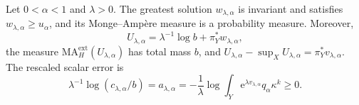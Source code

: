 \begin{proposition}\label{prop:nonlp-selection-separated}
Let $0<\alpha<1$ and $\lambda>0$. The greatest solution $w_{\lambda,\alpha}$ is invariant and satisfies $w_{\lambda,\alpha}\geq u_\alpha$, and its Monge--Amp\`ere measure is a probability measure. Moreover,
\[
 U_{\lambda,\alpha}=\lambda^{-1}\log b+\pi_Y^*w_{\lambda,\alpha},
\]
the measure $\mathrm{MA}^{\mathrm{ext}}_H(U_{\lambda,\alpha})$ has total mass $b$, and $U_{\lambda,\alpha}-\sup_XU_{\lambda,\alpha}=\pi_Y^*v_{\lambda,\alpha}$. The rescaled scalar error is
\begin{equation}\label{eq:nonlp-selection-scalar-error}
 \lambda^{-1}\log(c_{\lambda,\alpha}/b)=a_{\lambda,\alpha}
 =-\frac1\lambda\log\int_Y\mathrm{e}^{\lambda v_{\lambda,\alpha}}q_\alpha\kappa^k\geq0.
\end{equation}
\end{proposition}
